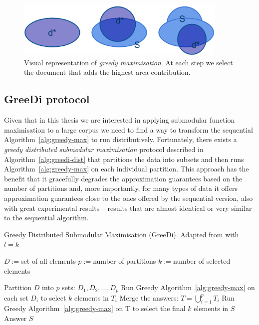\begin{figure}
  \centering
  \includegraphics[width=0.9\textwidth,natwidth=1516,natheight=411]{images/sub-max.png}
  \caption{Visual representation of \emph{greedy maximisation}. At each step we
  select the document that adds the highest area contribution.}
  \label{fig:sub-max}
\end{figure}

\subsection{GreeDi protocol}
Given that in this thesis we are interested in applying submodular function
maximisation to a large corpus we need to find a way to transform the
sequential Algorithm~\ref{alg:greedy-max} to run distributively. Fortunately,
there exists a \emph{greedy distributed submodular maximisation} protocol
described in Algorithm~\ref{alg:greedi-dist} that partitions the data into
subsets and then runs Algorithm~\ref{alg:greedy-max} on each individual
partition. This approach has the benefit that it gracefully degrades the
approximation guarantees based on the number of partitions and, more
importantly, for many types of data it offers approximation guarantees close to
the ones offered by the sequential version, also with great experimental
results \cite{mirzasoleiman2013distributed} -- results that are almost identical or very
similar to the sequential algorithm.
\begin{algorithm}
  \caption{Greedy Distributed Submodular Maximisation (GreeDi).
      Adapted from \cite{mirzasoleiman2013distributed} with \(l = k\)}
  \label{alg:greedi-dist}
  \begin{algorithmic}
    \STATE \(D := \)set of all elements
    \STATE \(p := \)number of partitions
    \STATE \(k := \)number of selected elements
  \end{algorithmic}
  \begin{algorithmic}[1]
    \STATE Partition \(D\) into \(p\) sets: \(D_1, D_2, \ldots, D_p\)
    \STATE Run Greedy Algorithm~\ref{alg:greedy-max} on each set \(D_i\) to
        select \(k\) elements in \(T_i\)
    \STATE Merge the answers: \(T = \bigcup_{i=1}^p T_i\)
    \STATE Run Greedy Algorithm~\ref{alg:greedy-max} on T to select the final
        \(k\) elements in \(S\)
    \STATE Answer \(S\)
  \end{algorithmic}
\end{algorithm}

